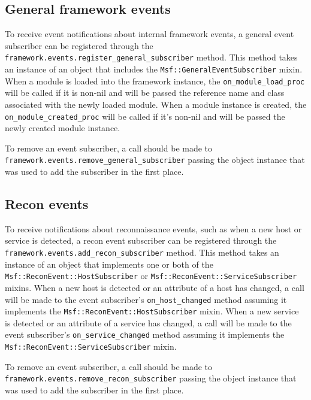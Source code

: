 \documentclass{report}
\begin{document}
        \subsection{General framework events}

\par
To receive event notifications about internal framework events, a
general event subscriber can be registered through the
\texttt{framework.events.register\_general\_subscriber} method.
This method takes an instance of an object that includes the
\texttt{Msf::GeneralEventSubscriber} mixin.  When a module is loaded
into the framework instance, the \texttt{on\_module\_load\_proc}
will be called if it is non-nil and will be passed the reference
name and class associated with the newly loaded module. When a
module instance is created, the \texttt{on\_module\_created\_proc}
will be called if it's non-nil and will be passed the newly created
module instance.

\par
To remove an event subscriber, a call should be made to\\
\texttt{framework.events.remove\_general\_subscriber} passing the
object instance that was used to add the subscriber in the first
place.

        \subsection{Recon events}

\par
To receive notifications about reconnaissance events, such as when a
new host or service is detected, a recon event subscriber can be
registered through the
\texttt{framework.events.add\_recon\_subscriber} method.  This
method takes an instance of an object that implements one or both of
the \texttt{Msf::ReconEvent::HostSubscriber} or
\texttt{Msf::ReconEvent::ServiceSubscriber} mixins.  When a new host
is detected or an attribute of a host has changed, a call will be
made to the event subscriber's \texttt{on\_host\_changed} method
assuming it implements the \texttt{Msf::ReconEvent::HostSubscriber}
mixin.  When a new service is detected or an attribute of a service
has changed, a call will be made to the event subscriber's
\texttt{on\_service\_changed} method assuming it implements the
\texttt{Msf::ReconEvent::ServiceSubscriber} mixin.

\par
To remove an event subscriber, a call should be made to\\
\texttt{framework.events.remove\_recon\_subscriber} passing the
object instance that was used to add the subscriber in the first
place.
\end{document}
